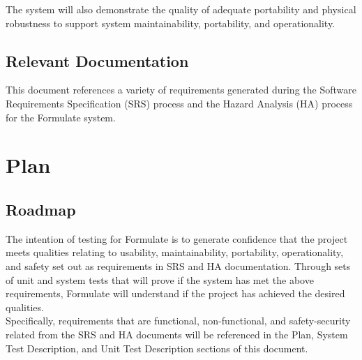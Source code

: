 \documentclass[12pt, titlepage]{article}
\begin{document}
  The system will also demonstrate the quality of adequate portability and physical robustness to support system maintainability, portability, and operationality.\\



\subsection{Relevant Documentation}



  This document references a variety of requirements generated during the Software Requirements Specification (SRS) process and the Hazard Analysis (HA) process for the Formulate system. \\


\newpage
\section{Plan}

  
  \subsection{Roadmap}

  The intention of testing for Formulate is to generate confidence that the project meets qualities relating to usability, maintainability, portability, operationality, and safety set out as requirements in SRS and HA documentation. Through sets of unit and system tests that will prove if the system has met the above requirements, Formulate will understand if the project has achieved the desired qualities.\\

  Specifically, requirements that are functional, non-functional, and safety-security related from the SRS and HA documents will be referenced in the Plan, System Test Description, and Unit Test Description sections of this document.\\
\end{document}
